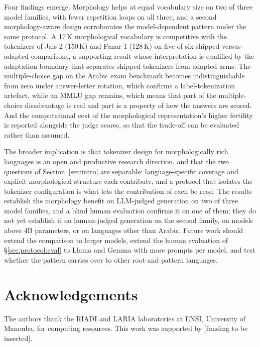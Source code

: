 \documentclass[a4paper,fleqn]{cas-sc}
\begin{document}
Four findings emerge. Morphology helps at equal vocabulary size on two of three model families, with fewer repetition loops on all three, and a second morphology-aware design corroborates the model-dependent pattern under the same protocol. A 17\,K morphological vocabulary is competitive with the tokenizers of Jais-2 (150\,K) and Fanar-1 (128\,K) on five of six shipped-versus-adapted comparisons, a supporting result whose interpretation is qualified by the adaptation boundary that separates shipped tokenizers from adapted arms. The multiple-choice gap on the Arabic exam benchmark becomes indistinguishable from zero under answer-letter rotation, which confirms a label-tokenization artefact, while an MMLU gap remains, which means that part of the multiple-choice disadvantage is real and part is a property of how the answers are scored. And the computational cost of the morphological representation's higher fertility is reported alongside the judge scores, so that the trade-off can be evaluated rather than assumed.

The broader implication is that tokenizer design for morphologically rich languages is an open and productive research direction, and that the two questions of Section~\ref{sec:intro} are separable: language-specific coverage and explicit morphological structure each contribute, and a protocol that isolates the tokenizer configuration is what lets the contribution of each be read. The results establish the morphology benefit on LLM-judged generation on two of three model families, and a blind human evaluation confirms it on one of them; they do not yet establish it on human-judged generation on the second family, on models above 4B parameters, or on languages other than Arabic. Future work should extend the comparison to larger models, extend the human evaluation of \S\ref{sec:protocol:eval} to Llama and Gemma with more prompts per model, and test whether the pattern carries over to other root-and-pattern languages.

\section*{Acknowledgements}

The authors thank the RIADI and LARIA laboratories at ENSI, University of Manouba, for computing resources. This work was supported by [funding to be inserted].

\printcredits



\end{document}
